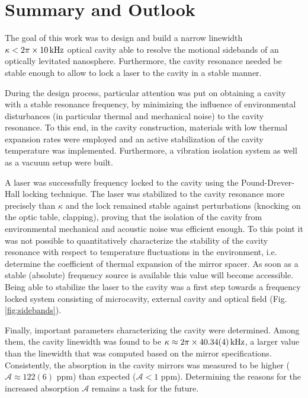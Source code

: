 \chapter{Summary and Outlook}
The goal of this work was to design and build a narrow linewidth $\kappa < 2\pi\times 10\,\text{kHz}$ optical cavity able to resolve the motional sidebands of an optically levitated nanosphere. Furthermore, the cavity resonance needed be stable enough to allow to lock a laser to the cavity in a stable manner.

During the design process, particular attention was put on obtaining a cavity with a stable resonance frequency, by minimizing the influence of environmental disturbances (in particular thermal and mechanical noise) to the cavity resonance. To this end, in the cavity construction, materials with low thermal expansion rates were employed and an active stabilization of the cavity temperature was implemented. Furthermore, a vibration isolation system as well as a vacuum setup were built.

A laser was successfully frequency locked to the cavity using the Pound-Drever-Hall locking technique. The laser was stabilized to the cavity resonance more precisely than $\kappa$ and the lock remained stable against perturbations (knocking on the optic table, clapping), proving that the isolation of the cavity from environmental mechanical and acoustic noise was efficient enough. To this point it was not possible to quantitatively characterize the stability of the cavity resonance with respect to temperature fluctuations in the environment, i.e. determine the coefficient of thermal expansion of the mirror spacer. As soon as a stable (absolute) frequency source is available this value will become accessible. Being able to stabilize the laser to the cavity was a first step towards a frequency locked system consisting of microcavity, external cavity and optical field (Fig. \ref{fig:sidebands}).

Finally, important parameters characterizing the cavity were determined. Among them, the cavity linewidth was found to be $\kappa \approx 2\pi\times40.34(4) \,\text{kHz}$, a larger value than the linewidth that was computed based on the mirror specifications. Consistently, the absorption in the cavity mirrors was measured to be higher ($\mathcal{A} \approx 122(6)$ ppm) than expected ($\mathcal{A}<1$ ppm). Determining the reasons for the increased absorption $\mathcal{A}$ remains a task for the future.
